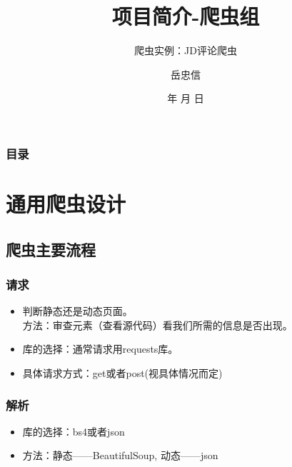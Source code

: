 \documentclass{beamer}
\begin{document}
\title{项目简介-爬虫组}
\subtitle{爬虫实例：JD评论爬虫}

\author{岳忠信}


\renewcommand{\today}{\number\year 年 \number\month 月 \number\day 日}
\date{\today}

\subject{Presentations}

\begin{frame}
\titlepage
\end{frame}

\begin{frame}
\frametitle{目录}
\begin{multicols}{2}
\end{multicols}
\end{frame}

\section{通用爬虫设计}

\subsection{爬虫主要流程}
\begin{frame}
\frametitle{请求}
\begin{itemize}
  \item 判断静态还是动态页面。\\方法：审查元素（查看源代码）看我们所需的信息是否出现。
  \item 库的选择：通常请求用requests库。
  \item 具体请求方式：get或者post(视具体情况而定)
\end{itemize}
\end{frame}

\begin{frame}
\frametitle{解析}
\begin{itemize}
  \item 库的选择：bs4或者json
  \item 方法：静态——BeautifulSoup, 动态——json
\end{itemize}
\end{frame}
\end{document}
